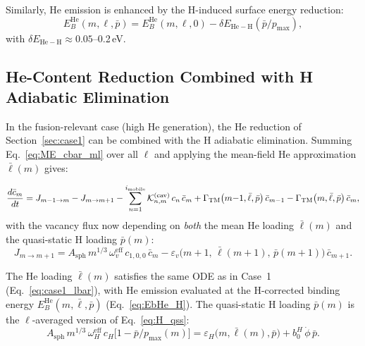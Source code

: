 \documentclass[pdflatex,sn-basic]{sn-jnl} %
\begin{document}
Similarly, He emission is enhanced by the H-induced surface energy
reduction:
\begin{equation}\label{eq:EbHe_H}
    E_B^{\mathrm{He}}(m,\ell,\bar{p})
    = E_B^{\mathrm{He}}(m,\ell,0)
    - \delta E_{\mathrm{He-H}}(\bar{p}/p_{\max}),
\end{equation}
with $\delta E_{\mathrm{He-H}} \approx 0.05$--0.2\,eV.

\subsection{He-Content Reduction Combined with H Adiabatic Elimination}
\label{sec:H_combined}

In the fusion-relevant case (high He generation), the He reduction of
Section~\ref{sec:case1} can be combined with the H adiabatic
elimination.  Summing Eq.~\eqref{eq:ME_cbar_ml} over all $\ell$ and
applying the mean-field He approximation $\bar{\ell}(m)$ gives:

\begin{equation}\label{eq:ME_cbar_m_H}
\frac{d\bar{c}_m}{dt}
= J_{m-1 \to m} - J_{m \to m+1}
  - \sum_{n=1}^{i_{\rm mobile}}
    \mathcal{K}_{n,m}^{(\mathrm{cav})}\,c_n\,\bar{c}_m
  + \Gamma_{\mathrm{TM}}\bigl(m{-}1,\bar{\ell},\bar{p}\bigr)\,\bar{c}_{m-1}
  - \Gamma_{\mathrm{TM}}\bigl(m,\bar{\ell},\bar{p}\bigr)\,\bar{c}_m,
\end{equation}
with the vacancy flux now depending on \emph{both} the mean He loading
$\bar{\ell}(m)$ and the quasi-static H loading $\bar{p}(m)$:
\begin{equation}
    J_{m \to m+1}
    = A_{\mathrm{sph}}\,m^{1/3}\,\omega_v^{\mathrm{eff}}\,
      c_{1,0,0}\,\bar{c}_m
    - \varepsilon_v\bigl(m{+}1,\,\bar{\ell}(m{+}1),\,\bar{p}(m{+}1)\bigr)\,
      \bar{c}_{m+1}.
\end{equation}

The He loading $\bar{\ell}(m)$ satisfies the same ODE as in
Case~1 (Eq.~\ref{eq:case1_lbar}), with He emission evaluated at the
H-corrected binding energy $E_B^{\mathrm{He}}(m,\bar{\ell},\bar{p})$
(Eq.~\ref{eq:EbHe_H}).  The quasi-static H loading $\bar{p}(m)$ is
the $\ell$-averaged version of Eq.~\eqref{eq:H_qss}:
\begin{equation}\label{eq:H_qss_combined}
    A_{\mathrm{sph}}\,m^{1/3}\,\omega_H^{\mathrm{eff}}\,c_H
    \bigl[1 - \bar{p}/p_{\max}(m)\bigr]
    = \varepsilon_H\bigl(m,\bar{\ell}(m),\bar{p}\bigr)
    + b_0^H\,\dot{\phi}\,\bar{p}.
\end{equation}
\end{document}
